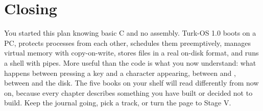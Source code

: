\documentclass[11pt,a4paper]{article}
\begin{document}
\section{Closing}

You started this plan knowing basic C and no assembly. Turk-OS 1.0 boots on a PC, protects processes from each other,
schedules them preemptively, manages virtual memory with copy-on-write, stores files in a real on-disk format, and runs
a shell with pipes. More useful than the code is what you now understand: what happens between pressing a key and a
character appearing, between  and , between  and the disk. The five books on your
shelf will read differently from now on, because every chapter describes something you have built or decided not to
build. Keep the journal going, pick a track, or turn the page to Stage V.

\booklegend
\end{document}
